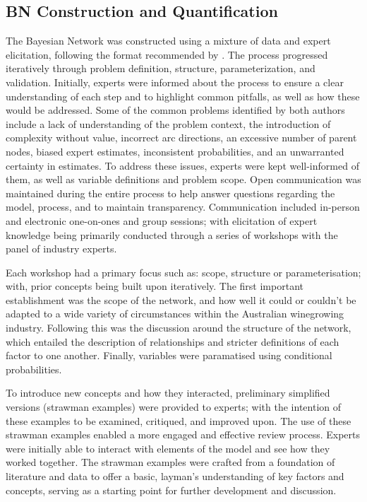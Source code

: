 \documentclass[fleqn,10pt]{wlscirep}
\begin{document}
\subsection{BN Construction and Quantification}

The Bayesian Network was constructed using a mixture of data and expert elicitation, following the format recommended by . The process progressed iteratively through problem definition, structure, parameterization, and validation. Initially, experts were informed about the process to ensure a clear understanding of each step and to highlight common pitfalls, as well as how these would be addressed. Some of the common problems identified by both authors include a lack of understanding of the problem context, the introduction of complexity without value, incorrect arc directions, an excessive number of parent nodes, biased expert estimates, inconsistent probabilities, and an unwarranted certainty in estimates. To address these issues, experts were kept well-informed of them, as well as variable definitions and problem scope. Open communication was maintained during the entire process to help answer questions regarding the model, process, and to maintain transparency. Communication included in-person and electronic one-on-ones and group sessions; with elicitation of expert knowledge being primarily conducted through a series of workshops with the panel of industry experts.

Each workshop had a primary focus such as: scope, structure or parameterisation; with, prior concepts being built upon iteratively. The first important establishment was the scope of the network, and how well it could or couldn't be adapted to a wide variety of circumstances within the Australian winegrowing industry. Following this was the discussion around the structure of the network, which entailed the description of relationships and stricter definitions of each factor to one another. Finally, variables were paramatised using conditional probabilities.

To introduce new concepts and how they interacted, preliminary simplified versions (strawman examples) were provided to experts; with the intention of these examples to be examined, critiqued, and improved upon. The use of these strawman examples enabled a more engaged and effective review process. Experts were initially able to interact with elements of the model and see how they worked together. The strawman examples were crafted from a foundation of literature and data to offer a basic, layman's understanding of key factors and concepts, serving as a starting point for further development and discussion. 
\end{document}

